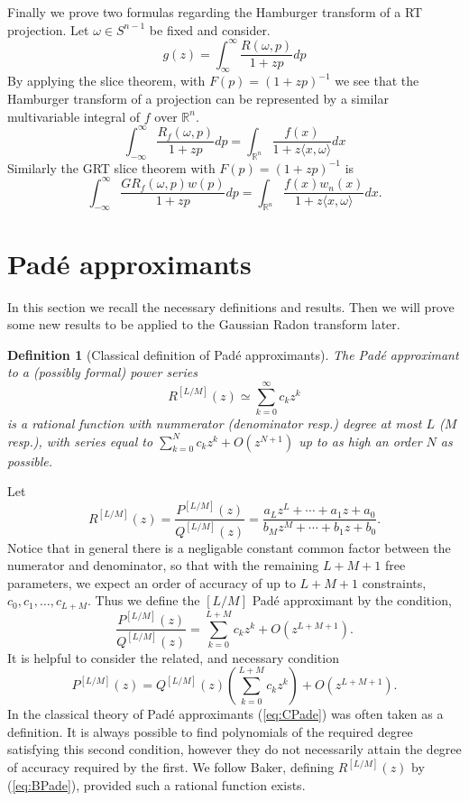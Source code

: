 \documentclass{amsart}
\newtheorem{definition}[theorem]{Definition}
\theoremstyle{remark}
\numberwithin{equation}{section}
\newcommand{\RR}{\mathbb{R}}
\begin{document}
Finally we prove two formulas regarding the Hamburger transform of a RT projection. Let $\omega \in S^{n-1}$ be fixed and consider.
\[
    g(z) = \int_\infty^\infty \frac{R(\omega, p)}{1 + zp} dp
\]
By applying the slice theorem, with $F(p) = {(1+zp)}^{-1}$ we see that the Hamburger transform of a projection can be represented by a similar multivariable integral of $f$ over $\RR^n$.
\[
    \int_{-\infty}^\infty \frac{R_f(\omega, p)}{1 + zp} dp = \int_{\RR^n} \frac{f(x)}{1 + z\langle x, \omega \rangle} dx
\]
Similarly the GRT slice theorem with $F(p) = {(1 + zp)}^{-1}$ is
\[
    \int_{-\infty}^\infty \frac{GR_f(\omega, p) w(p)}{1 + zp} dp = \int_{\RR^n} \frac{f(x)w_n(x)}{1 + z\langle x, \omega \rangle} dx.
\]




\section{Pad\'e approximants}

In this section we recall the necessary definitions and results. Then we will prove some new results to be applied to the Gaussian Radon transform later.

\begin{definition}[Classical definition of Pad\'e approximants]
The Pad\'e approximant to a (possibly formal) power series 
\[
    R^{[L/M]}(z) \simeq \sum_{k=0}^\infty c_k z^k
\]
is a rational function with nummerator (denominator resp.) degree at most $L$ ($M$ resp.), with series equal to $\sum_{k=0}^N c_k z^k + O(z^{N+1})$ up to as high an order $N$ as possible. 
\end{definition}
Let
\[
    R^{[L/M]}(z) = \frac{P^{[L/M]}(z)}{Q^{[L/M]}(z)} = \frac{a_L z^L + \cdots + a_1z + a_0}{b_M z^M + \cdots + b_1z + b_0}.
\]
Notice that in general there is a negligable constant common factor between the numerator and denominator, so that with the remaining $L+M+1$ free parameters, we expect an order of accuracy of up to $L+M+1$ constraints, $c_0, c_1, \ldots, c_{L+M}$. Thus we define the $[L/M]$ Pad\'e approximant by the condition,
\begin{equation}
    \label{eq:BPade}
    \frac{P^{[L/M]}(z)}{Q^{[L/M]}(z)} = \sum_{k=0}^{L+M} c_k z^k + O\left(z^{L+M+1}\right).
\end{equation}
It is helpful to consider the related, and necessary condition
\begin{equation}
    \label{eq:CPade}
    P^{[L/M]}(z) = Q^{[L/M]}(z)\left(\sum_{k=0}^{L+M} c_k z^k\right) + O\left(z^{L+M+1}\right).
\end{equation}
In the classical theory of Pad\'e approximants (\ref{eq:CPade}) was often taken as a definition. It is always possible to find polynomials of the required degree satisfying this second condition, however they do not necessarily attain the degree of accuracy required by the first. We follow Baker, defining $R^{[L/M]}(z)$ by (\ref{eq:BPade}), provided such a rational function exists.
\end{document}
